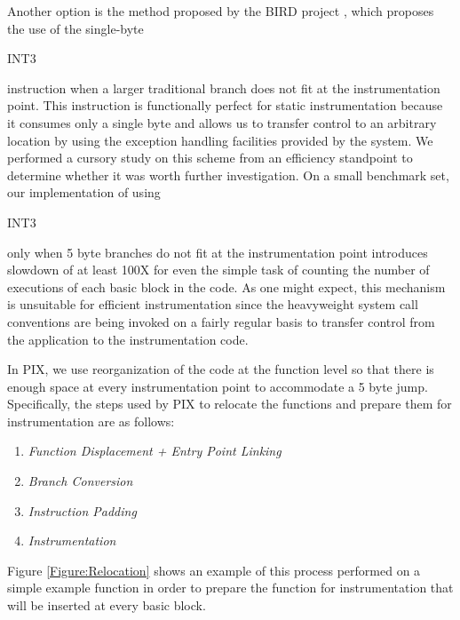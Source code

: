 Another option is the method proposed by the BIRD project \cite{nanda2006bird}, which
proposes the use of the single-byte \begin{it}INT3\end{it} instruction when a larger traditional
branch does not fit at the instrumentation point. This instruction is functionally
perfect for static instrumentation because it consumes only a single byte and
allows us to transfer control to an arbitrary location by using the exception handling
facilities provided by the system. We performed a cursory study on this scheme
from an efficiency standpoint to determine whether it was worth further
investigation. On a small benchmark set, our implementation of using
\begin{it}INT3\end{it} only when 5 byte branches do not fit at
the instrumentation point introduces slowdown of at least 100X for
even the simple task of counting the number of executions of each basic block in the code. As one might
expect, this mechanism is unsuitable for efficient instrumentation since the
heavyweight system call conventions are being invoked on a fairly regular basis to
transfer control from the application to the instrumentation code.

In PIX, we use reorganization of the code at the function level so that
there is enough space at every instrumentation point to accommodate a 5 byte
jump. Specifically, the steps used by PIX to relocate the functions and prepare them
for instrumentation are as follows:

\begin{enumerate}
 \item \textit{Function Displacement + Entry Point Linking}
 \item \textit{Branch Conversion}
 \item \textit{Instruction Padding}
 \item \textit{Instrumentation}
\end{enumerate}

Figure \ref{Figure:Relocation} shows an example of this process performed on 
a simple example function in order to prepare the function for instrumentation
that will be inserted at every basic block.

